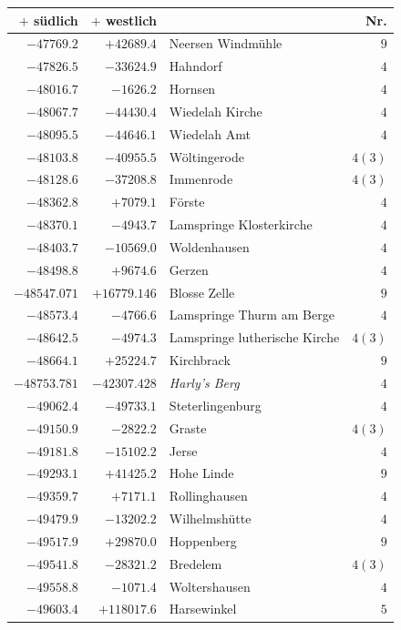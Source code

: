 \clearpage{}%
\begin{center}\begingroup\fontsize{8}{9}\selectfont
\setlength{\tabcolsep}{4pt}
\begin{tabular}{r|r|p{170pt}|r}\hline
\(+\) südlich&\(+\) westlich&&Nr.\\\hline
\(-47769.2\)&\(+42689.4\)&Neersen Windmühle&\(9\)\\
\(-47826.5\)&\(-33624.9\)&Hahndorf&\(4\)\\
\(-48016.7\)&\(-1626.2\)&Hornsen&\(4\)\\
\(-48067.7\)&\(-44430.4\)&Wiedelah Kirche&\(4\)\\
\(-48095.5\)&\(-44646.1\)&Wiedelah Amt&\(4\)\\
\(-48103.8\)&\(-40955.5\)&Wöltingerode&\(4 (3)\)\\
\(-48128.6\)&\(-37208.8\)&Immenrode&\(4 (3)\)\\
\(-48362.8\)&\(+7079.1\)&Förste&\(4\)\\
\(-48370.1\)&\(-4943.7\)&Lamspringe Klosterkirche&\(4\)\\
\(-48403.7\)&\(-10569.0\)&Woldenhausen&\(4\)\\
\(-48498.8\)&\(+9674.6\)&Gerzen&\(4\)\\
\(-48547.071\)&\(+16779.146\)&Blosse Zelle&\(9\)\\
\(-48573.4\)&\(-4766.6\)&Lamspringe Thurm am Berge&\(4\)\\
\(-48642.5\)&\(-4974.3\)&Lamspringe lutherische Kirche&\(4 (3)\)\\
\(-48664.1\)&\(+25224.7\)&Kirchbrack&\(9\)\\
\(-48753.781\)&\(-42307.428\)&\textit{Harly’s Berg}&\(4\)\\
\(-49062.4\)&\(-49733.1\)&Steterlingenburg&\(4\)\\
\(-49150.9\)&\(-2822.2\)&Graste&\(4 (3)\)\\
\(-49181.8\)&\(-15102.2\)&Jerse&\(4\)\\
\(-49293.1\)&\(+41425.2\)&Hohe Linde&\(9\)\\
\(-49359.7\)&\(+7171.1\)&Rollinghausen&\(4\)\\
\(-49479.9\)&\(-13202.2\)&Wilhelmshütte&\(4\)\\
\(-49517.9\)&\(+29870.0\)&Hoppenberg&\(9\)\\
\(-49541.8\)&\(-28321.2\)&Bredelem&\(4 (3)\)\\
\(-49558.8\)&\(-1071.4\)&Woltershausen&\(4\)\\
\(-49603.4\)&\(+118017.6\)&Harsewinkel&\(5\)\\

\end{tabular}
\end{center}
